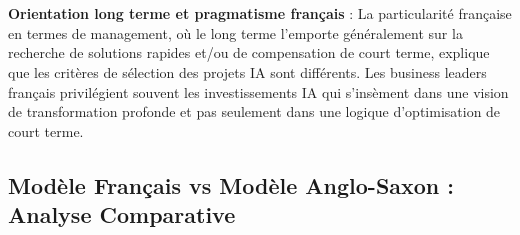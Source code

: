 \\\\
\textbf{Orientation long terme et pragmatisme français} : La particularité française en termes de management, où le long terme l'emporte généralement sur la recherche de solutions rapides et/ou de compensation de court terme, explique que les critères de sélection des projets IA sont différents. Les business leaders français privilégient souvent les investissements IA qui s'insèment dans une vision de transformation profonde et pas seulement dans une logique d'optimisation de court terme.

\subsection{Modèle Français vs Modèle Anglo-Saxon : Analyse Comparative}

